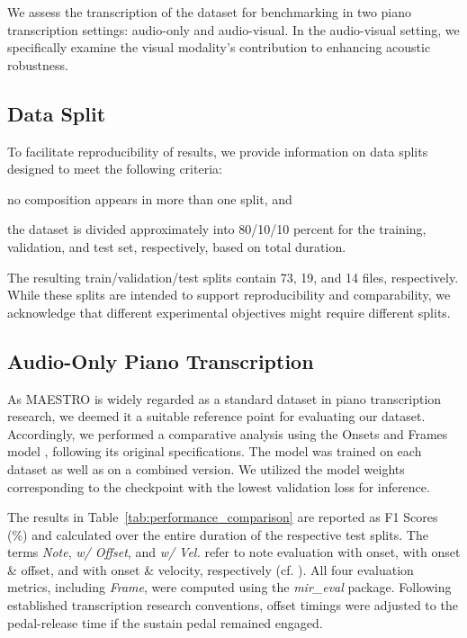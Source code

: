 \documentclass{article}
\begin{document}
We assess the transcription of the dataset for benchmarking in two piano transcription settings: audio-only and audio-visual. In the audio-visual setting, we specifically examine the visual modality's contribution to enhancing acoustic robustness. 

\subsection{Data Split}
To facilitate reproducibility of results, we provide information on data splits designed to meet the following criteria: 
\begin{inparaenum}[(i)]
    \item no composition appears in more than one split, and 
    \item the dataset is divided approximately into 80/10/10 percent for the training, validation, and test set, respectively, based on total duration. 
\end{inparaenum}
The resulting train/validation/test splits contain 73, 19, and 14 files, respectively. While these splits are intended to support reproducibility and comparability, we acknowledge that different experimental objectives might require different splits.

\subsection{Audio-Only Piano Transcription}
As MAESTRO is widely regarded as a standard dataset in piano transcription research, we deemed it a suitable reference point for evaluating our dataset. Accordingly, we performed a comparative analysis using the Onsets and Frames model \cite{ISMIR18Hawthorne}, following its original specifications. The model was trained on each dataset as well as on a combined version. We utilized the model weights corresponding to the checkpoint with the lowest validation loss for inference. 

The results in Table~\ref{tab:performance_comparison} are reported as F1 Scores (\%) and calculated over the entire duration of the respective test splits. The terms \textit{Note}, \textit{w/ Offset}, and \textit{w/ Vel.} refer to note evaluation with onset, with onset \& offset, and with onset \& velocity, respectively (cf. \cite{TASLP21Kong}). All four evaluation metrics, including \textit{Frame}, were computed using the \textit{mir\_eval} package. Following established transcription research conventions, offset timings were adjusted to the pedal-release time if the sustain pedal remained engaged.
\end{document}
